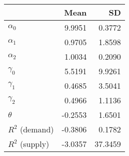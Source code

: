 
\begin{tabular}[t]{lrr}
\toprule
  & Mean & SD\\
\midrule
$\alpha_{0}$ & 9.9951 & 0.3772\\
$\alpha_{1}$ & 0.9705 & 1.8598\\
$\alpha_{2}$ & 1.0034 & 0.2090\\
$\gamma_{0}$ & 5.5191 & 9.9261\\
$\gamma_{1}$ & 0.4685 & 3.5041\\
$\gamma_{2}$ & 0.4966 & 1.1136\\
$\theta$ & -0.2553 & 1.6501\\
$R^{2}$ (demand) & -0.3806 & 0.1782\\
$R^{2}$ (supply) & -3.0357 & 37.3459\\
\bottomrule
\end{tabular}
